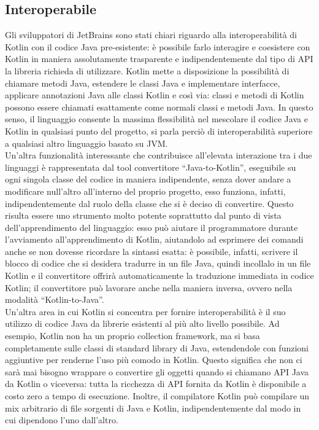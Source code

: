 \subsection{Interoperabile}
Gli sviluppatori di JetBrains sono stati chiari riguardo alla interoperabilità di Kotlin con il codice Java pre-esistente: è possibile farlo interagire e coesistere con Kotlin in maniera assolutamente trasparente e indipendentemente dal tipo di API la libreria richieda di utilizzare. Kotlin mette a disposizione la possibilità di chiamare metodi Java, estendere le classi Java e implementare interfacce, applicare annotazioni Java alle classi Kotlin e così via: classi e metodi di Kotlin possono essere chiamati esattamente come normali classi e metodi Java. In questo senso, il linguaggio consente la massima flessibilità nel mescolare il codice Java e Kotlin in qualsiasi punto del progetto, si parla perciò di interoperabilità superiore a qualsiasi altro linguaggio basato su JVM.\\
Un’altra funzionalità interessante che contribuisce all’elevata interazione tra i due linguaggi è rappresentata dal tool convertitore “Java-to-Kotlin”, eseguibile su ogni singola classe del codice in maniera indipendente, senza dover andare a modificare null’altro all’interno del proprio progetto, esso funziona, infatti, indipendentemente dal ruolo della classe che si è deciso di convertire. Questo risulta essere uno strumento molto potente soprattutto dal punto di vista dell’apprendimento del linguaggio: esso può aiutare il programmatore durante l’avviamento all'apprendimento di Kotlin, aiutandolo ad esprimere dei comandi anche se non dovesse ricordare la sintassi esatta: è possibile, infatti, scrivere il blocco di codice che si desidera tradurre in un file Java, quindi incollalo in un file Kotlin e il convertitore offrirà automaticamente la traduzione immediata in codice Kotlin; il convertitore può lavorare anche nella maniera inversa, ovvero nella modalità “Kotlin-to-Java”.\\
Un'altra area in cui Kotlin si concentra per fornire interoperabilità è il suo utilizzo di codice Java da librerie esistenti al più alto livello possibile. Ad esempio, Kotlin non ha un proprio collection framework, ma si basa completamente sulle classi di standard library di Java, estendendole con funzioni aggiuntive per renderne l’uso più comodo in Kotlin. Questo significa che non ci sarà mai bisogno wrappare o convertire gli oggetti quando si chiamano API Java da Kotlin o viceversa: tutta la ricchezza di API fornita da Kotlin è disponibile a costo zero a tempo di esecuzione. Inoltre, il compilatore Kotlin può compilare un mix arbitrario di file sorgenti di Java e Kotlin, indipendentemente dal modo in cui dipendono l'uno dall'altro.\\

